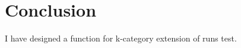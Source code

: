 \documentclass[12pt]{article}
\theoremstyle{plain}
\theoremstyle{definition}
\theoremstyle{remark}
\begin{document}
\newpage
\section{Conclusion}
I have designed a function for k-category extension of runs test.
\end{document}
